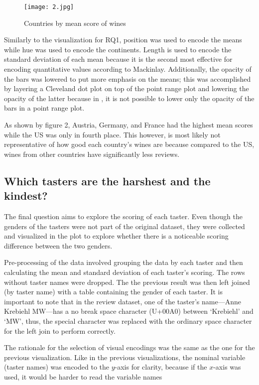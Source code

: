 \begin{figure}[h]
  \texttt{[image: 2.jpg]} 
  \caption{Countries by mean score of wines}
\end{figure}

Similarly to the visualization for RQ1, position was used to encode the means while hue was used to encode the continents. Length is used to encode the standard deviation of each mean because it is the second most effective for encoding quantitative values according to Mackinlay. Additionally, the opacity of the bars was lowered to put more emphasis on the means; this was accomplished by layering a Cleveland dot plot on top of the point range plot and lowering the opacity of the latter because in , it is not possible to lower only the opacity of the bars in a point range plot.

As shown by figure 2, Austria, Germany, and France had the highest mean scores while the US was only in fourth place. This however, is most likely not representative of how good each country's wines are because compared to the US, wines from other countries have significantly less reviews.

\subsection{Which tasters are the harshest and the kindest?}
The final question aims to explore the scoring of each taster. Even though the genders of the tasters were not part of the original dataset, they were collected and visualized in the plot to explore whether there is a noticeable scoring difference between the two genders.

Pre-processing of the data involved grouping the data by each taster and then calculating the mean and standard deviation of each taster's scoring. The rows without taster names were dropped. The the previous result was then left joined (by taster name) with a table containing the gender of each taster. It is important to note that in the review dataset, one of the taster's name---Anne Krebiehl MW---has a no break space character (U+00A0) between `Krebiehl' and `MW', thus, the special character was replaced with the ordinary space character for the left join to perform correctly.

The rationale for the selection of visual encodings was the same as the one for the previous visualization. Like in the previous visualizations, the nominal variable (taster names) was encoded to the $y$-axis for clarity, because if the $x$-axis was used, it would be harder to read the variable names 

